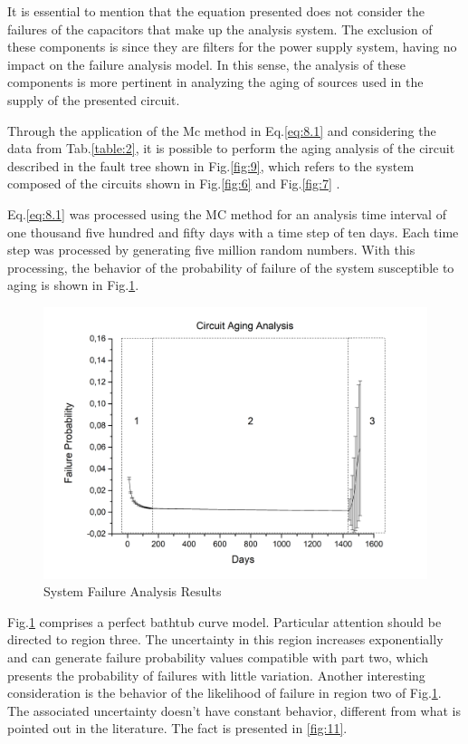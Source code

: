 \documentclass{ws-m3as}
\begin{document}
It is essential to mention that the equation presented does not consider the failures of the capacitors that make up the analysis system. The exclusion of these components is since they are filters for the power supply system, having no impact on the failure analysis model. In this sense, the analysis of these components is more pertinent in analyzing the aging of sources used in the supply of the presented circuit. 

Through the application of the Mc method in Eq.\ref{eq:8.1} and considering the data from Tab.\ref{table:2}, it is possible to perform the aging analysis of the circuit described in the fault tree shown in Fig.\ref{fig:9}, which refers to the system composed of the circuits shown in Fig.\ref{fig:6} and Fig.\ref{fig:7} . 

Eq.\ref{eq:8.1} was processed using the MC method for an analysis time interval of one thousand five hundred and fifty days with a time step of ten days. Each time step was processed by generating five million random numbers. With this processing, the behavior of the probability of failure of the system susceptible to aging is shown in Fig.\ref{fig:10}.

\begin{figure} [H]
	\centering
	\includegraphics[width=0.75\linewidth]{"Figures/Circuit Failure Probability"}
	\caption{System Failure Analysis Results}
	\label{fig:circuit-failure-probability}
	\label{fig:10}	
\end{figure}

Fig.\ref{fig:10} comprises a perfect bathtub curve model. Particular attention should be directed to region three. The uncertainty in this region increases exponentially and can generate failure probability values compatible with part two, which presents the probability of failures with little variation. Another interesting consideration is the behavior of the likelihood of failure in region two of Fig.\ref{fig:10}. The associated uncertainty doesn't have constant behavior, different from what is pointed out in the literature. The fact is presented in \ref{fig:11}.
\end{document}

